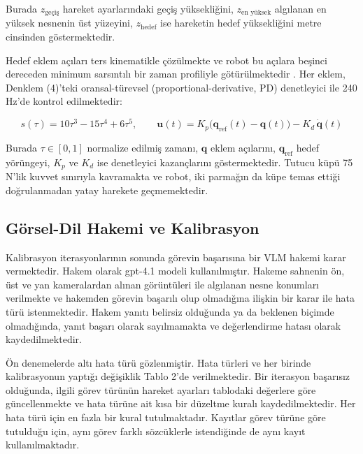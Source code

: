 \documentclass[preprint,12pt]{elsarticle}
\begin{document}
Burada \(z_{\text{geçiş}}\) hareket ayarlarındaki geçiş yüksekliğini, \(z_{\text{en yüksek}}\) algılanan en yüksek nesnenin üst yüzeyini, \(z_{\text{hedef}}\) ise hareketin hedef yüksekliğini metre cinsinden göstermektedir.

Hedef eklem açıları ters kinematikle çözülmekte ve robot bu açılara beşinci dereceden minimum sarsıntılı bir zaman profiliyle götürülmektedir \cite{flash1985coordination}. Her eklem, Denklem (4)'teki oransal-türevsel (proportional-derivative, PD) denetleyici ile 240 Hz'de kontrol edilmektedir:

\begin{equation}
s(\tau) = 10\tau^3 - 15\tau^4 + 6\tau^5, \qquad \mathbf{u}(t) = K_p\big(\mathbf{q}_{\text{ref}}(t) - \mathbf{q}(t)\big) - K_d\,\dot{\mathbf{q}}(t)
\label{eq:4}
\end{equation}

Burada \(\tau \in [0, 1]\) normalize edilmiş zamanı, \(\mathbf{q}\) eklem açılarını, \(\mathbf{q}_{\text{ref}}\) hedef yörüngeyi, \(K_p\) ve \(K_d\) ise denetleyici kazançlarını göstermektedir. Tutucu küpü 75 N'lik kuvvet sınırıyla kavramakta ve robot, iki parmağın da küpe temas ettiği doğrulanmadan yatay harekete geçmemektedir.

\hypertarget{guxf6rsel-dil-hakemi-ve-kalibrasyon}{%
\subsection{Görsel-Dil Hakemi ve Kalibrasyon}\label{guxf6rsel-dil-hakemi-ve-kalibrasyon}}

Kalibrasyon iterasyonlarının sonunda görevin başarısına bir VLM hakemi karar vermektedir. Hakem olarak gpt-4.1 modeli kullanılmıştır. Hakeme sahnenin ön, üst ve yan kameralardan alınan görüntüleri ile algılanan nesne konumları verilmekte ve hakemden görevin başarılı olup olmadığına ilişkin bir karar ile hata türü istenmektedir. Hakem yanıtı belirsiz olduğunda ya da beklenen biçimde olmadığında, yanıt başarı olarak sayılmamakta ve değerlendirme hatası olarak kaydedilmektedir.

Ön denemelerde altı hata türü gözlenmiştir. Hata türleri ve her birinde kalibrasyonun yaptığı değişiklik Tablo 2'de verilmektedir. Bir iterasyon başarısız olduğunda, ilgili görev türünün hareket ayarları tablodaki değerlere göre güncellenmekte ve hata türüne ait kısa bir düzeltme kuralı kaydedilmektedir. Her hata türü için en fazla bir kural tutulmaktadır. Kayıtlar görev türüne göre tutulduğu için, aynı görev farklı sözcüklerle istendiğinde de aynı kayıt kullanılmaktadır.
\end{document}
